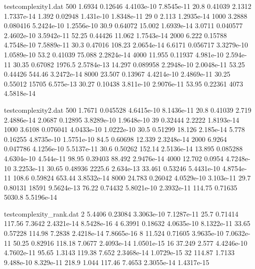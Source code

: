 \documentclass[a4paper,10pt]{article}
\begin{document}
\begin{filecontents}[overwrite]{testcomplexity1.dat}
500		1.6934	0.12646		4.4103e-10	7.8545e-11	20.8	0.41039	2.1312	1.7337e-14	1.392	0.02948		1.431e-10	1.8348e-11	29		0		2.113	1.2935e-14
1000	3.2888	0.080416	5.2424e-10	1.2556e-10	30.9	0.64072	15.002	1.6939e-14	3.0711	0.040577	2.4602e-10	3.5942e-11	52.25	0.44426	11.062	1.7543e-14
2000	6.222	0.15788		4.7548e-10	7.5889e-11	30.3	0.47016	108.23	2.0654e-14	6.6171	0.056717	3.3279e-10	1.0589e-10	53.2	0.41039	75.088	2.2824e-14
4000	11.955	0.11937		4.981e-10	2.594e-11	30.35	0.67082	1976.5	2.5784e-13	14.297	0.089958	2.2948e-10	2.0048e-11	53.25	0.44426	544.46	3.2472e-14
8000	23.507	0.13967		4.4214e-10	2.4869e-11	30.25	0.55012	15705	6.575e-13	30.27	0.10438		3.811e-10	2.9076e-11	53.95	0.22361	4073	4.5818e-14
\end{filecontents}
\begin{filecontents}[overwrite]{testcomplexity2.dat}
500		1.7671	0.045528	4.6415e-10	8.1436e-11	20.8	0.41039	2.719	2.4886e-14	2.0687	0.12895		3.8289e-10	1.9648e-10	39		0.32444	2.2222	1.8193e-14
1000	3.6108	0.076041	4.0433e-10	1.0222e-10	30.5	0.51299	18.126	2.185e-14	5.778	0.16255		4.8735e-10	1.5751e-10	84.5	0.60698	12.339	2.3248e-14
2000	6.9264	0.047786	4.1256e-10	5.5137e-11	30.6	0.50262	152.14	2.5136e-14	13.895	0.085288	4.6304e-10	4.544e-11	98.95	0.39403	88.492	2.9476e-14
4000	12.702	0.0954		4.7248e-10	3.2253e-11	30.65	0.48936	2225.6	2.634e-13	33.461	0.53246		5.4431e-10	4.8754e-11	108.6	0.59824	653.44	3.8532e-14
8000	24.783	0.26042		4.0529e-10	3.103e-11	29.7	0.80131	18591	9.5624e-13	76.22	0.74432		5.8021e-10	2.3932e-11	114.75	0.71635	5030.8	5.5196e-14
\end{filecontents}
\begin{filecontents}[overwrite]{testcomplexity_rank.dat}
2       5.4406  0.23084 3.3063e-10      7.1287e-11      25.7    0.71414 117.56  7.3642  2.4321e-14      8.5428e-16
4       6.3991  0.18632 4.0635e-10      8.1322e-11      33.65   0.57228 114.98  7.2838  2.4218e-14      7.8665e-16
8       11.524  0.71605 3.9635e-10      7.0632e-11      50.25   0.82916 118.18  7.0677  2.4093e-14      1.0501e-15
16      37.249  2.577   4.4246e-10      4.7602e-11      95.65   1.3143  119.38  7.652   2.3468e-14      1.0729e-15
32      114.87  1.7133  9.488e-10       8.329e-11       218.9   1.044   117.46  7.4653  2.3055e-14      1.4317e-15
\end{filecontents}
\end{document}
